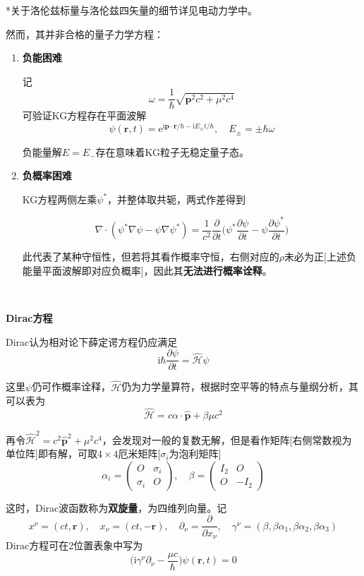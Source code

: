 \documentclass[a4paper,UTF8,fontset=windows]{ctexart}
\newcommand*{\ir}{\mathrm{i}}
\newcommand*{\er}{\mathrm{e}}
\newcommand*{\br}{\mathbf{r}}
\newcommand*{\bp}{\mathbf{p}}
\begin{document}
*关于洛伦兹标量与洛伦兹四矢量的细节详见电动力学中。

然而，其并非合格的量子力学方程：
\begin{enumerate}
    \item \textbf{负能困难}

    记
    $$\omega=\frac{1}{\hbar}\sqrt{\bp^2c^2+\mu^2c^4}$$
    可验证KG方程存在平面波解
    $$\psi(\br,t)=\er^{\ir\bp\cdot\br/\hbar-\ir E_\pm t/\hbar},\quad E_\pm=\pm\hbar\omega$$

    负能量解$E=E_-$存在意味着KG粒子无稳定量子态。

    \item \textbf{负概率困难}
    
    KG方程两侧左乘$\psi^*$，并整体取共轭，两式作差得到

    $$\nabla\cdot(\psi^*\nabla\psi-\psi\nabla\psi^*)=\frac{1}{c^2}\frac{\partial}{\partial t}\bigg(\psi^*\frac{\partial\psi}{\partial t}-\psi\frac{\partial\psi^*}{\partial t}\bigg)$$

    此代表了某种守恒性，但若将其看作概率守恒，右侧对应的$\rho$未必为正[上述负能量平面波解即对应负概率]，因此其\textbf{无法进行概率诠释}。
\end{enumerate}

\

\textbf{Dirac方程}

Dirac认为相对论下薛定谔方程仍应满足
$$\ir\hbar\frac{\partial\psi}{\partial t}=\hat{\mathcal{H}}\psi$$

这里$\psi$仍可作概率诠释，$\hat{\mathcal{H}}$仍为力学量算符，根据时空平等的特点与量纲分析，其可以表为
$$\hat{\mathcal{H}}=c\alpha\cdot\hat{\bp}+\beta\mu c^2$$

再令$\hat{\mathcal{H}}^2=c^2\hat{\bp}^2+\mu^2c^4$，会发现对一般的复数无解，但是看作矩阵[右侧常数视为单位阵]即有解，可取$4\times4$厄米矩阵[$\sigma_i$为泡利矩阵]
$$\alpha_i=\begin{pmatrix}O&\sigma_i\\\sigma_i&O\end{pmatrix},\quad\beta=\begin{pmatrix}I_2&O\\O&-I_2\end{pmatrix}$$

这时，Dirac波函数称为\textbf{双旋量}，为四维列向量。记
$$x^\nu=(ct,\br),\quad x_\nu=(ct,-\br),\quad\partial_\nu=\frac{\partial}{\partial x_\nu},\quad\gamma^\nu=(\beta,\beta\alpha_1,\beta\alpha_2,\beta\alpha_3)$$
Dirac方程可在2位置表象中写为
$$\bigg(\ir\gamma^\nu\partial_\nu-\frac{\mu c}{\hbar}\bigg)\psi(\br,t)=0$$
\end{document}
